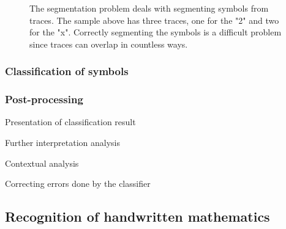\begin{figure}[H]
\centering
{}
\caption{The segmentation problem deals with segmenting symbols from traces. The sample above has three traces, one for the "2"  and two for the "x". Correctly segmenting the symbols is a difficult problem since traces can overlap in countless ways.}
\label{fig:segmentation}
\end{figure}

\subsubsection{Classification of symbols}
% 

\subsubsection{Post-processing}
Presentation of classification result

Further interpretation analysis

Contextual analysis

Correcting errors done by the classifier

\subsection{Recognition of handwritten mathematics} \label{recognition of handwritten mathematics}

